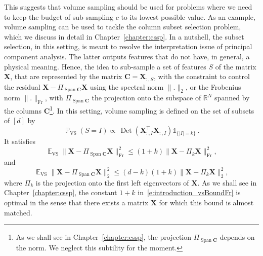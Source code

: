\documentclass[twoside,11pt]{book}
\newtheorem{theorem}{Theorem}
\numberwithin{theorem}{chapter}
\numberwithin{definition}{chapter}
\numberwithin{proposition}{chapter}
\numberwithin{corollary}{chapter}
\numberwithin{example}{chapter}
\numberwithin{lemma}{chapter}
\numberwithin{assumption}{chapter}
\numberwithin{equation}{chapter}
\numberwithin{figure}{chapter}
\DeclareMathOperator{\Det}{Det}
\DeclareMathOperator{\Span}{\mathrm{Span}}
\DeclareMathOperator{\Fr}{\mathrm{Fr}}
\DeclareMathOperator{\VS}{\mathrm{VS}}
\DeclareMathOperator{\Tran}{\intercal}
\DeclareMathOperator{\EX}{\mathbb{E}}
\DeclareMathOperator{\Prb}{\mathbb{P}}
\begin{document}

This suggests that volume sampling should be used for problems where we need to keep the budget of sub-sampling $c$ to its lowest possible value. As an example,  volume sampling can be used to tackle the column subset selection problem, which we discuss in detail in Chapter~\ref{chapter:cssp}. In a nutshell, the subset selection, in this setting, is meant to resolve the interpretation issue of principal component analysis. The latter outputs features that do not have, in general, a physical meaning. Hence, the idea to sub-sample a set of  features $S$ of the matrix $\bm{X}$, that are represented by the matrix $\bm{C} = \bm{X}_{:,S}$, with the constraint to control the residual $\bm{X}-\Pi_{\Span \bm{C}}\bm{X}$ using the spectral norm $\|.\|_{2}$, or the Frobenius norm $\|.\|_{\Fr}$, with $\Pi_{\Span \bm{C}}$ the projection onto the subspace of $\mathbb{R}^{N}$ spanned by the columns $\bm{C}$\footnote{As we shall see in Chapter~\ref{chapter:cssp}, the projection $\Pi_{\Span \bm{C}}$ depends on the norm. We neglect this subtility for the moment.}. In this setting, volume sampling is defined on the set of subsets of $[d]$ by
\begin{equation}
\Prb_{\VS}(S=I) \propto \,\Det(\bm{X}_{:,I}^{\Tran}\bm{X}_{:,I}^{\phantom{\Tran}}) \mathbb{1}_{\{|I| = k \}} \:.
\label{e:introduction_vs}
\end{equation}
It satisfies \citep*{DRVW06}
\begin{equation}
\EX_{\VS} \| \bm{X} - \Pi_{\Span \bm{C}}\bm{X} \|_{\Fr}^{2} \leq (1+k)\| \bm{X} - \Pi_{k}\bm{X} \|_{\Fr}^{2},
\label{e:introduction_vsBoundFr}
\end{equation}
and
\begin{equation}
\EX_{\VS} \| \bm{X} - \Pi_{\Span \bm{C}}\bm{X} \|_{2}^{2} \leq (d-k)(1+k)\| \bm{X} - \Pi_{k}\bm{X} \|_{2}^{2},
\label{e:introduction_vsBound2}
\end{equation}
where $\Pi_{k}$ is the projection onto the first left eigenvectors of $\bm{X}$. As we shall see in Chapter~\ref{chapter:cssp}, the constant $1+k$ in~\eqref{e:introduction_vsBoundFr} is optimal in the sense that there exists a matrix $\bm{X}$ for which this bound is almost matched.
\end{document}
